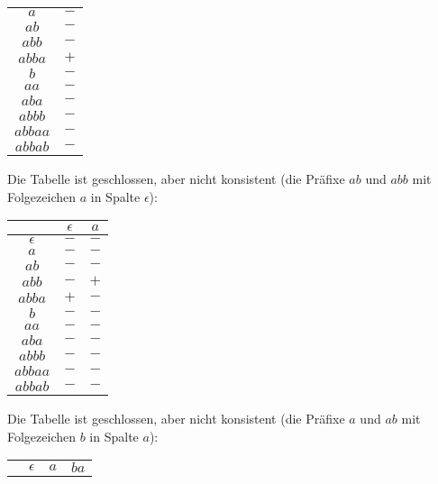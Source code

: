 \documentclass[11pt,a4paper]{article}
\begin{document}
{{\begin{loesung}
\begin{enumerate}
\begin{table}[h!]
\begin{tabular}{c|c}
                $a$ & $-$ \\
                $ab$ & $-$ \\
                $abb$ & $-$ \\
                $abba$ & $+$ \\
                \hline
                $b$ & $-$ \\
                $aa$ & $-$ \\
                $aba$ & $-$ \\
                $abbb$ & $-$ \\
                $abbaa$ & $-$ \\
                $abbab$ & $-$ \\
            \end{tabular}
        \end{table}
        \FloatBarrier
        Die Tabelle ist geschlossen, aber nicht konsistent (die Präfixe $ab$ und $abb$ mit Folgezeichen $a$ in Spalte $\epsilon$):
        \begin{table}[h!]
            \centering
            \begin{tabular}{c|cc}
                & $\epsilon$ & $a$ \\
                \hline
                $\epsilon$ & $-$ & $-$ \\
                $a$ & $-$ & $-$ \\
                $ab$ & $-$ & $-$ \\
                $abb$ & $-$ & $+$ \\
                $abba$ & $+$ & $-$ \\
                \hline
                $b$ & $-$ & $-$ \\
                $aa$ & $-$ & $-$ \\
                $aba$ & $-$ & $-$ \\
                $abbb$ & $-$ & $-$ \\
                $abbaa$ & $-$ & $-$ \\
                $abbab$ & $-$ & $-$ \\
            \end{tabular}
        \end{table}
        \FloatBarrier
        Die Tabelle ist geschlossen, aber nicht konsistent (die Präfixe $a$ und $ab$ mit Folgezeichen $b$ in Spalte $a$):
        \begin{table}[h!]
            \centering
            \begin{tabular}{c|ccc}
                & $\epsilon$ & $a$ & $ba$ \\

\end{tabular}
\end{table}
\end{enumerate}
\end{loesung}}}
\end{document}
